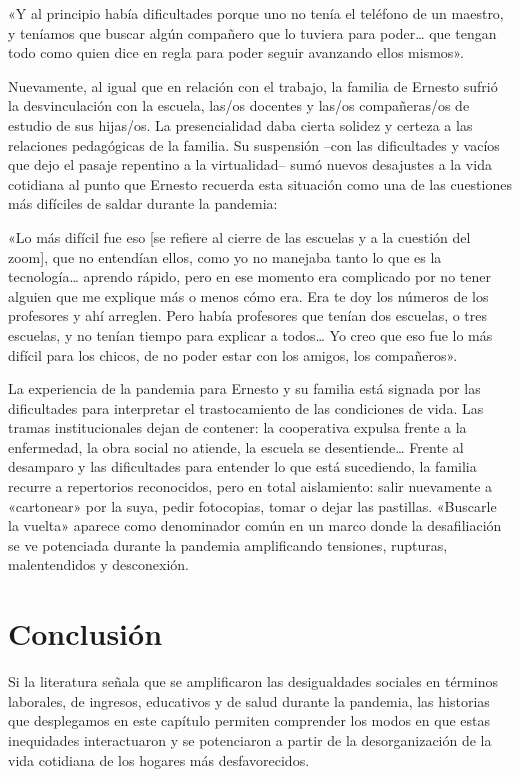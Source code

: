\begin{refsection}
\begin{gbcita}
«Y al principio había dificultades porque uno no tenía el teléfono de un maestro, y teníamos que buscar algún compañero que lo tuviera para poder… que tengan todo como quien dice en regla para poder seguir avanzando ellos mismos».

\end{gbcita}

Nuevamente, al igual que en relación con el trabajo, la familia de Ernesto sufrió la desvinculación con la escuela, las/os docentes y las/os compañeras/os de estudio de sus hijas/os. La presencialidad daba cierta solidez y certeza a las relaciones pedagógicas de la familia. Su suspensión –con las dificultades y vacíos que dejo el pasaje repentino a la virtualidad– sumó nuevos desajustes a la vida cotidiana al punto que Ernesto recuerda esta situación como una de las cuestiones más difíciles de saldar durante la pandemia:


\begin{gbcita}
«Lo más difícil fue eso [se refiere al cierre de las escuelas y a la cuestión del zoom], que no entendían ellos, como yo no manejaba tanto lo que es la tecnología… aprendo rápido, pero en ese momento era complicado por no tener alguien que me explique más o menos cómo era. Era te doy los números de los profesores y ahí arreglen. Pero había profesores que tenían dos escuelas, o tres escuelas, y no tenían tiempo para explicar a todos… Yo creo que eso fue lo más difícil para los chicos, de no poder estar con los amigos, los compañeros».

\end{gbcita}

La experiencia de la pandemia para Ernesto y su familia está signada por las dificultades para interpretar el trastocamiento de las condiciones de vida. Las tramas institucionales dejan de contener: la cooperativa expulsa frente a la enfermedad, la obra social no atiende, la escuela se desentiende… Frente al desamparo y las dificultades para entender lo que está sucediendo, la familia recurre a repertorios reconocidos, pero en total aislamiento: salir nuevamente a «cartonear» por la suya, pedir fotocopias, tomar o dejar las pastillas. «Buscarle la vuelta» aparece como denominador común en un marco donde la desafiliación se ve potenciada durante la pandemia amplificando tensiones, rupturas, malentendidos y desconexión.


\section[Conclusión]{Conclusión}
\label{cap-25.conclusion}
Si la literatura señala que se amplificaron las desigualdades sociales en términos laborales, de ingresos, educativos y de salud durante la pandemia, las historias que desplegamos en este capítulo permiten comprender los modos en que estas inequidades interactuaron y se potenciaron a partir de la desorganización de la vida cotidiana de los hogares más desfavorecidos.


\end{refsection}
